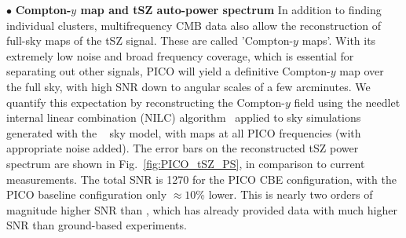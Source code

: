 \documentclass[PICOReport.tex]{subfiles}
\begin{document}
%
\noindent$\bullet$ {\bf Compton-$y$ map and tSZ auto-power spectrum} \hspace{0.1in} \label{ymap}  In addition to finding individual clusters, multifrequency CMB data also allow the reconstruction of full-sky maps of the tSZ signal. These are called  'Compton-$y$ maps'. %
With its extremely low noise and broad frequency coverage, which is essential for separating out other signals, PICO will yield a definitive Compton-$y$ map over the full sky, with high \ac{SNR} down to angular scales of a few arcminutes.  We quantify this expectation by reconstructing the Compton-$y$ field using the needlet internal linear combination (NILC) algorithm~\citep{Delabrouille2009} applied to sky simulations generated with the \planck~ sky model, with maps at all PICO frequencies (with appropriate noise added).  The error bars on the reconstructed tSZ power spectrum are shown in Fig.~\ref{fig:PICO_tSZ_PS}, in comparison to current measurements.  The total \ac{SNR} is 1270 for the PICO CBE configuration, with the PICO baseline configuration only $\approx 10$\% lower.  This is nearly two orders of magnitude higher \ac{SNR} than \planck , which has already provided data with much higher \ac{SNR} than ground-based experiments. 
\end{document}
